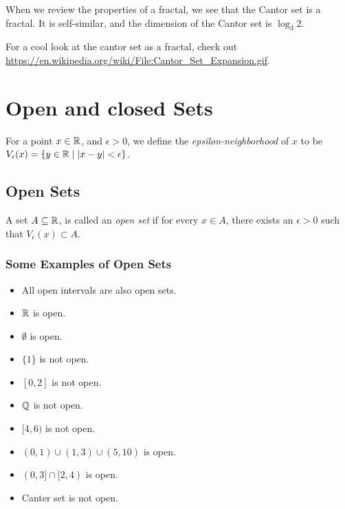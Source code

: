 When we review the properties of a fractal, we see that the Cantor set is a fractal. It is self-similar, and the dimension of the Cantor set is \(\log_3 2\).

\begin{note}
    For a cool look at the cantor set as a fractal, check out \url{https://en.wikipedia.org/wiki/File:Cantor_Set_Expansion.gif}.
\end{note}

\renewcommand{\theenumi}{\arabic{enumi}}
\renewcommand{\labelenumi}{\theenumi.}
\section{Open and closed Sets}

\begin{definition}
    For a point \(x \in \mathbb{R}\), and \(\epsilon > 0\), we define the \textit{epsilon-neighborhood} of \(x\) to be \(V_\epsilon(x) = \{y \in \mathbb{R} \mid |x - y| < \epsilon\}\).
\end{definition}

\subsection{Open Sets}

\begin{definition}
    A set \(A \subseteq \mathbb{R}\), is called an \textit{open set} if for every \(x \in A\), there exists an \(\epsilon > 0\) such that \(V_\epsilon(x) \subset A\).
\end{definition}

\subsubsection{Some Examples of Open Sets}

\begin{multicols}{2}
    \begin{itemize}
        \item All open intervals are also open sets.
        \item \(\mathbb{R}\) is open.
        \item \(\emptyset\) is open.
        \item \(\{1\}\) is not open.
        \item \([0,2]\) is not open.
        \item \(\mathbb{Q}\) is not open.
        \item \([4,6)\) is not open.
        \item \((0,1) \cup (1,3) \cup (5,10)\) is open.
        \item \((0,3] \cap [2,4)\) is open.
        \item Canter set is not open.
    \end{itemize}
\end{multicols}

